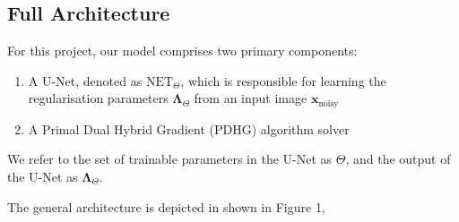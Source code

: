 \documentclass[12pt]{article}
\begin{document}
\subsection{Full Architecture}




For this project, our model comprises two primary components:
\begin{enumerate}
    \item A U-Net, denoted as $\text{NET}_{\Theta}$, which is responsible for learning the regularisation parameters $\mathbf{\Lambda}_{\Theta}$ from an input image 
    $\mathbf{x}_{\text{noisy}}$
    \item A Primal Dual Hybrid Gradient (PDHG) algorithm solver 
\end{enumerate}

We refer to the set of trainable parameters in the U-Net as $\Theta$, and the output of the U-Net as $\mathbf{\Lambda}_{\Theta}$.

The general architecture is depicted in shown in Figure 1,
\end{document}
